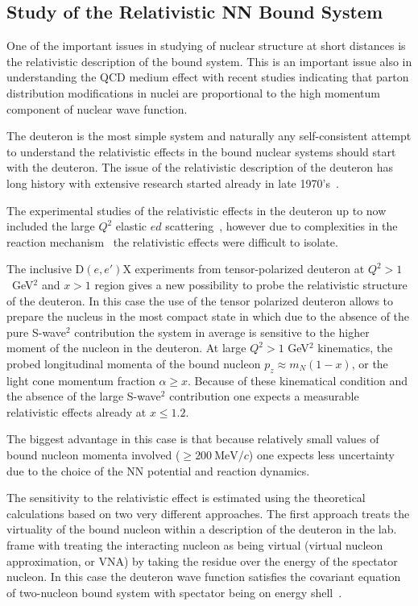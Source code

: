\subsection{Study of the Relativistic NN Bound System}

One of the important issues in studying of nuclear structure  at short distances is the 
relativistic description of the bound system.  This is an important issue also in 
understanding the QCD medium effect with recent studies indicating that  parton distribution 
modifications  in nuclei are proportional to the high momentum component of nuclear wave function.

The deuteron is the most simple system and naturally any self-consistent attempt  to understand the 
relativistic effects in the bound nuclear systems  should start with the deuteron. 
The issue of the relativistic description of the deuteron has long history with extensive research 
started already in late 1970's~\cite{Gross:1982nz,Buck:1979ff,Frankfurt:1977vc,Frankfurt:1981mk}.

The experimental studies of the relativistic effects in the deuteron  up to now included the large $Q^2$ elastic 
$ed$ scattering~\cite{Alexa:1998fe}, however  
due to complexities  in the reaction mechanism~\cite{VanOrden:1995eg} the relativistic effects were 
difficult to isolate.

The inclusive D$(e,e')$X experiments from tensor-polarized deuteron at  $Q^2>1$~GeV$^2$ and $x>1$ region gives 
a new possibility to probe the relativistic structure of the deuteron.  In this case the use of the tensor polarized
deuteron allows to prepare the nucleus in the most compact state in which due to the absence of the 
pure S-wave$^2$ contribution the system in average is sensitive to the higher moment of the nucleon in the deuteron.
At large $Q^2>1$ GeV$^2$ kinematics, the probed longitudinal momenta of the bound nucleon $p_z \approx m_N(1-x)$, 
or the light cone momentum fraction $\alpha \ge x$. Because of these kinematical condition and the absence of the 
large S-wave$^2$ contribution one expects a measurable relativistic effects already at $x\le 1.2$.  

The biggest advantage in this case is that because relatively small values of bound nucleon momenta involved ($\ge 200~\mathrm{MeV}/c$)
one expects less uncertainty due to the choice of the NN potential  and reaction dynamics.

The sensitivity to the relativistic effect is estimated using the theoretical calculations based on two 
very different approaches.   The first approach treats the  virtuality of the bound nucleon within a
description of the deuteron in the lab. frame  with treating the interacting nucleon as being 
virtual (virtual nucleon approximation, or VNA) 
by taking the residue over the energy of the spectator nucleon.
In this case the deuteron wave function satisfies the covariant equation of two-nucleon bound system 
with spectator being on energy shell~\cite{Sargsian:2009hf,Gross:2010qm}.

